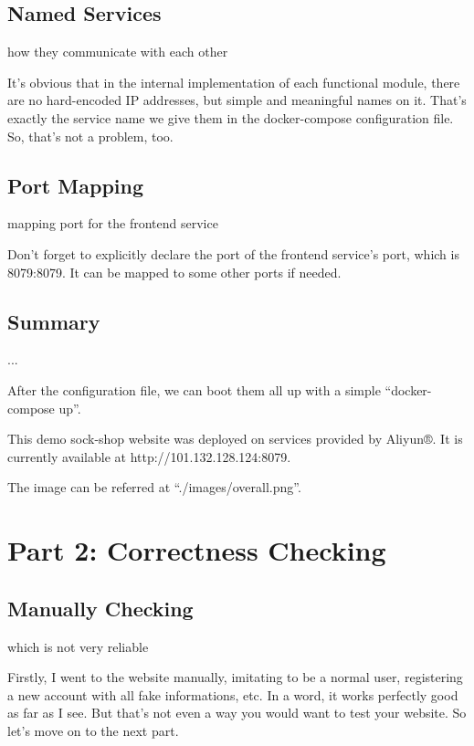 \documentclass[11pt, oneside]{article}   	%
\begin{document}
\subsection{Named Services}
how they communicate with each other
\newline

It's obvious that in the internal implementation of each functional module, there are no hard-encoded IP addresses, but simple and meaningful names on it. That's exactly the service name we give them in the docker-compose configuration file. So, that's not a problem, too.

\subsection{Port Mapping}
mapping port for the frontend service
\newline

Don't forget to explicitly declare the port of the frontend service's port, which is 8079:8079. It can be mapped to some other ports if needed.

\subsection{Summary}
...\newline

After the configuration file, we can boot them all up with a simple ``docker-compose up''.

This demo sock-shop website was deployed on services provided by Aliyun®. It is currently available at http://101.132.128.124:8079.

The image can be referred at ``./images/overall.png''.

\section{Part 2: Correctness Checking}

\subsection{Manually Checking}
which is not very reliable
\newline

Firstly, I went to the website manually, imitating to be a normal user, registering a new account with all fake informations, etc. In a word, it works perfectly good as far as I see. But that's not even a way you would want to test your website. So let's move on to the next part.
\end{document}
